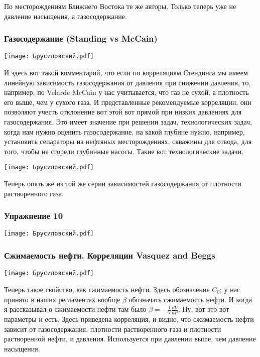\documentclass[main.tex]{subfiles}
\begin{document}
По месторождениям Ближнего Востока те же авторы.
Только теперь уже не давление насыщения, а газосодержание.

\subsubsection{Газосодержание (Standing vs McCain)}

\begin{center}
\texttt{[image: Брусиловский.pdf]}
\end{center}

И здесь вот такой комментарий, что если по корреляциям Стендинга мы имеем линейную зависимость газосодержания от давления при снижении давления, то, например, по Velarde McCain у нас учитывается, что газ не сухой, а плотность его выше, чем у сухого газа.
И представленные рекомендуемые корреляции, они позволяют учесть отклонение вот этой вот прямой при низких давлениях для газосодержания.
Это имеет значение при решении задач, технологических задач, когда нам нужно оценить газосодержание, на какой глубине нужно, например, установить сепараторы на нефтяных месторождениях, скважины для отвода, для того, чтобы не сгорели глубинные насосы.
Такие вот технологические задачи.

\begin{center}
\texttt{[image: Брусиловский.pdf]}
\end{center}

Теперь опять же из той же серии зависимостей газосодержания от плотности растворенного газа.

\subsubsection{Упражнение 10}

\begin{center}
\texttt{[image: Брусиловский.pdf]}
\end{center}

\subsubsection{Сжимаемость нефти. Корреляции Vasquez and Beggs}

\begin{center}
\texttt{[image: Брусиловский.pdf]}
\end{center}

Теперь такое свойство, как сжимаемость нефти.
Здесь обозначение $C_{0}$; у нас принято в наших регламентах вообще $\beta$ обозначать сжимаемость нефти.
И когда я рассказывал о сжимаемости нефти там было $\beta=-\frac{1}{V}\frac{dV}{dP}$.
Ну, вот это вот параметры и есть.
Здесь приведена корреляция, и видно, что сжимаемость нефти зависит от газосодержания, плотности растворенного газа и плотности растворенной нефти, и давления.
Используется при давлении выше, чем давление насыщения.
\end{document}
